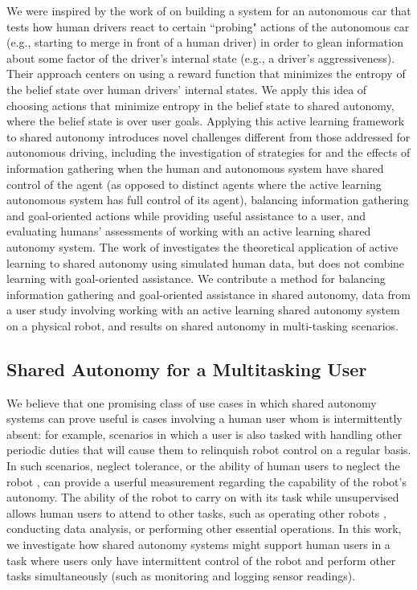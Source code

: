 \documentclass[conference]{IEEEtran}
\begin{document}
We were inspired by the work of \citet{sadigh2016information} on building a system for an autonomous car that tests how human drivers react to certain ``probing" actions of the autonomous car (e.g., starting to merge in front of a human driver) in order to glean information about some factor of the driver's internal state (e.g., a driver's aggressiveness). Their approach centers on using a reward function that minimizes the entropy of the belief state over human drivers' internal states. We apply this idea of choosing actions that minimize entropy in the belief state to shared autonomy, where the belief state is over user goals. Applying this active learning framework to shared autonomy introduces novel challenges different from those addressed for autonomous driving, including the investigation of strategies for and the effects of information gathering when the human and autonomous system have shared control of the agent (as opposed to distinct agents where the active learning autonomous system has full control of its agent), balancing information gathering and goal-oriented actions while providing useful assistance to a user, and evaluating humans’ assessments of working with an active learning shared autonomy system. The work of \citet{landolfi2017exploring} investigates the theoretical application of active learning to shared autonomy using simulated human data, but does not combine learning with goal-oriented assistance. We contribute a method for balancing information gathering and goal-oriented assistance in shared autonomy, data from a user study involving working with an active learning shared autonomy system on a physical robot, and results on shared autonomy in multi-tasking scenarios.

\subsection{Shared Autonomy for a Multitasking User}
We believe that one promising class of use cases in which shared autonomy systems can prove useful is cases involving a human user whom is intermittently absent: for example, scenarios in which a user is also tasked with handling other periodic duties that will cause them to relinquish robot control on a regular basis. In such scenarios, neglect tolerance, or the ability of human users to neglect the robot \cite{crandall2002characterizing, olsen2003metrics}, can provide a userful measurement regarding the capability of the robot's autonomy. The ability of the robot to carry on with its task while unsupervised allows human users to attend to other tasks, such as operating other robots \cite{crandall2005validating, cummings2008predicting}, conducting data analysis, or performing other essential operations. In this work, we investigate how shared autonomy systems might support human users in a task where users only have intermittent control of the robot and perform other tasks simultaneously (such as monitoring and logging sensor readings). 
\end{document}
